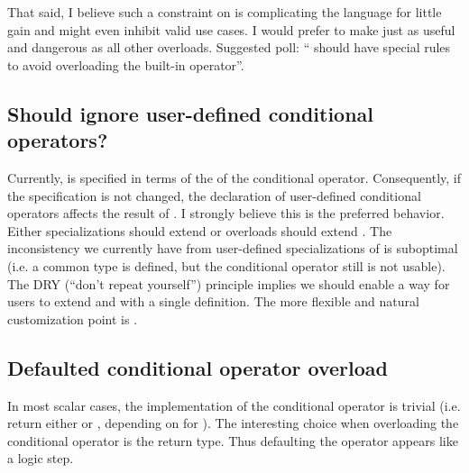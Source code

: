 That said, I believe such a constraint on  is complicating the language for little gain and might even inhibit valid use cases.
I would prefer to make  just as useful and dangerous as all other overloads.
Suggested poll: “ should have special rules to avoid overloading the built-in operator”.

\subsection{Should  ignore user-defined conditional operators?}
Currently,  is specified in terms of the  of the conditional operator.
Consequently, if the  specification is not changed, the declaration of user-defined conditional operators affects the result of .
I strongly believe this is the preferred behavior.
Either  specializations should extend  or  overloads should extend .
The inconsistency we currently have from user-defined specializations of  is suboptimal (i.e. a common type is defined, but the conditional operator still is not usable).
The DRY (“don't repeat yourself”) principle implies we should enable a way for users to extend  and  with a single definition.
The more flexible and natural customization point is .

\subsection{Defaulted conditional operator overload}
In most scalar cases, the implementation of the conditional operator is trivial (i.e. return either  or , depending on  for ).
The interesting choice when overloading the conditional operator is the return type.
Thus defaulting the operator appears like a logic step.

